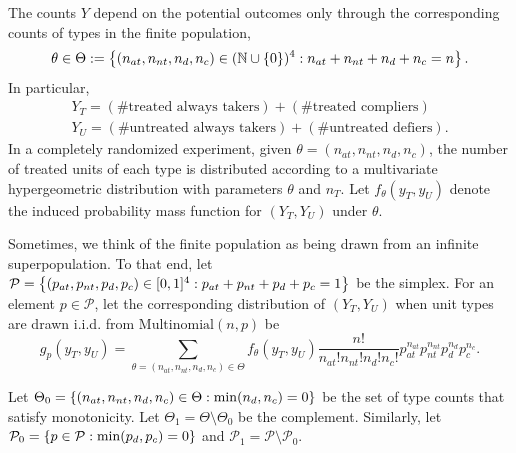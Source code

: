 \documentclass[12pt,reqno]{amsart}
\begin{document}
 The counts $Y$ depend on the potential outcomes only through
the
corresponding counts of types in the finite population, \[\theta \in \Theta :=   \left\{{(n_{at}, n_{nt}, n_d, n_c) \in (
\mathbb{N}\cup
\left\{{0}\right\})^4 : n_ {at} + n_{nt} + n_d + n_c
 = n}\right\}.
 \]
 In particular,
 \begin{align*}
 Y_T = (\text{\# treated always takers}) + (\text{\# treated compliers}) \\ 
 Y_U = (\text{\# untreated always takers}) + (\text{\# untreated defiers}).
 \end{align*}
 In a completely randomized experiment, given $\theta = (n_
 {at}, n_{nt}, n_d, n_c)$, the number of treated
 units of each type is distributed according to a multivariate hypergeometric
 distribution with parameters $\theta$ and $n_T$. Let $f_\theta(y_T, y_U)$ denote the induced
 probability mass function for $(Y_T, Y_U)$ under $\theta$. 

Sometimes, we think of the finite population as being drawn from an infinite
superpopulation. To that end, let $\mathcal P = \left\{{(p_{at}, p_{nt}, p_d, p_c) \in [0,1]^4
: p_{at} +  p_{nt} +  p_d +  p_c = 1}\right\}$ be the simplex. For an element $p \in \mathcal P$,
let the corresponding distribution of $(Y_T, Y_U)$ when unit types are drawn i.i.d. from
$\mathrm{Multinomial}(n, p)$ be \[
g_p(y_T, y_U) = \sum_{\theta = (n_{at}, n_{nt}, n_d, n_c) \in \Theta} f_\theta (y_T, y_U)
 \frac{n!}{n_{at}! n_{nt}! n_d ! n_c!} p_{at}^{n_{at}} p_{nt}^{n_{nt}} p_d^{n_d} p_c^{n_c}.
\]


Let $\Theta_0 = \left\{{(n_{at}, n_{nt}, n_d, n_c)  \in \Theta: \min(n_d, n_c) = 0}\right\}$ be the
set of type counts that satisfy monotonicity. Let
$\Theta_1 = \Theta \setminus \Theta_0$ be the complement. Similarly, let $\mathcal P_0 =
\left\{{p \in \mathcal P: \min(p_d, p_c) = 0}\right\}$ and $\mathcal P_1 = \mathcal P \setminus
\mathcal P_0$. 
\end{document}
